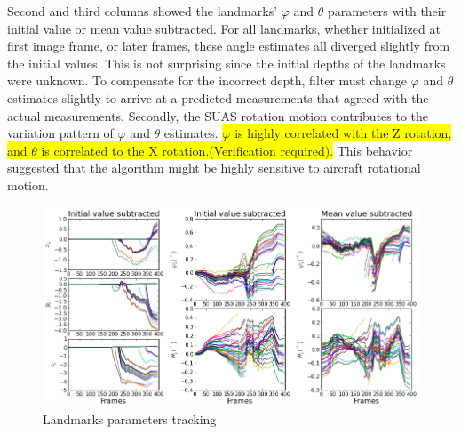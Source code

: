 Second and third columns showed the landmarks' $\varphi$ and $\theta$
parameters with their initial value or mean value subtracted. For all
landmarks, whether initialized at first image frame, or later frames,
these angle estimates all diverged slightly from the initial values.
This is not surprising since the initial depths of the landmarks were
unknown. To compensate for the incorrect depth, filter must change
$\varphi$ and $\theta$ estimates slightly to arrive at a predicted
measurements that agreed with the actual measurements. Secondly, the
SUAS rotation motion contributes to the variation pattern of $\varphi$
and $\theta$ estimates. \colorbox{yellow}{$\varphi$ is highly correlated with
  the Z rotation, and $\theta$ is correlated to the X
  rotation.(Verification required).} This behavior
suggested that the algorithm might be highly sensitive to aircraft
rotational motion.

\begin{figure}[h]
\centering
\includegraphics[width=14cm, keepaspectratio=true]
{./Figures/fltfig/cut1/Figure20.png}
\caption{Landmarks parameters tracking}
\label{fltfig:2}
\end{figure}
\FloatBarrier

